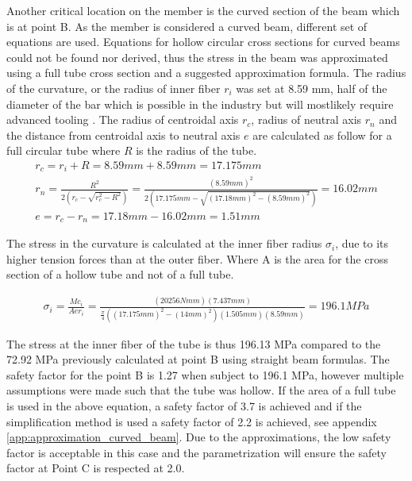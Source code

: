 Another critical location on the member is the curved section of the beam which is at point B. As the member is considered a curved beam, different set of equations are used. Equations for hollow circular cross sections for curved beams could not be found nor derived, thus the stress in the beam was approximated using a full tube cross section and a suggested approximation formula. The radius of the curvature, or the radius of inner fiber $r_i$ was set at 8.59 mm, half of the diameter of the bar which is possible in the industry but will mostlikely require advanced tooling \cite{listertube_tube_nodate}.  The radius of centroidal axis $r_c$, radius of neutral axis $r_n$ and the distance from centroidal axis to neutral axis $e$ are calculated as follow for a full circular tube where $R$ is the radius of the tube. 
\begin{gather}
r_c = r_i + R = 8.59mm + 8.59mm = 17.175 mm
\\
r_n = \frac{R^2}{2(r_c - \sqrt{r_c^2-R^2})} = \frac{(8.59 mm)^2}{2(17.175 mm - \sqrt{(17.18 mm)^2-(8.59 mm)^2})} =  16.02 mm
\\
e = r_c - r_n = 17.18 mm - 16.02 mm = 1.51 mm
\end{gather}

The stress in the curvature is calculated at the inner fiber radius $\sigma_i$, due to its higher tension forces than at the outer fiber. Where A is the area for the cross section of a hollow tube and not of a full tube.

\begin{gather}
\sigma_i = \frac{Mc_i}{Aer_i} = \frac{(20256 Nmm)(7.437 mm)}{\frac{\pi}{4} ((17.175mm)^2-(14mm)^2) (1.505 mm)(8.59 mm)} = 196.1 MPa  \label{eq:limb_curved_stress}
\end{gather}

The stress at the inner fiber of the tube is thus 196.13 MPa compared to the 72.92 MPa previously calculated at point B using straight beam formulas. The safety factor for the point B is 1.27 when subject to 196.1 MPa, however multiple assumptions were made such that the tube was hollow. If the area of a full tube is used in the above equation, a safety factor of 3.7 is achieved and if the simplification method is used a safety factor of 2.2 is achieved, see appendix \ref{app:approximation_curved_beam}. Due to the approximations, the low safety factor is acceptable in this case and the parametrization will ensure the safety factor at Point C is respected at 2.0.




